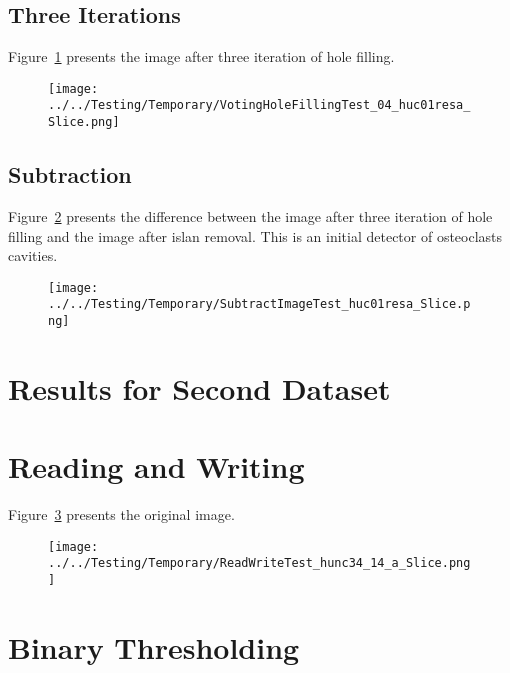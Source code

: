 \documentclass{InsightArticle}
\begin{document}
\subsection{Three Iterations}

Figure~\ref{fig:HoleFillingIteration03Image} presents the image after three iteration of hole filling.

\begin{figure}
\center
\texttt{[image: ../../Testing/Temporary/VotingHoleFillingTest\_04\_huc01resa\_Slice.png]}
\label{fig:HoleFillingIteration03Image}
\end{figure}



\subsection{Subtraction}

Figure~\ref{fig:SubtractionImage} presents the difference between the image
after three iteration of hole filling and the image after islan removal. This
is an initial detector of osteoclasts cavities.

\begin{figure}
\center
\texttt{[image: ../../Testing/Temporary/SubtractImageTest\_huc01resa\_Slice.png]}
\label{fig:SubtractionImage}
\end{figure}


\section{Results for Second Dataset}

\section{Reading and Writing}

Figure~\ref{fig:OriginalImage2} presents the original image.

\begin{figure}
\center
\texttt{[image: ../../Testing/Temporary/ReadWriteTest\_hunc34\_14\_a\_Slice.png]}
\label{fig:OriginalImage2}
\end{figure}


\section{Binary Thresholding}
\end{document}
